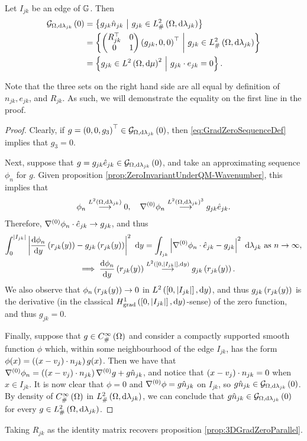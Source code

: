 \begin{prop} \label{prop:3DGradZeroRotated}
	Let $I_{jk}$ be an edge of $\mathbb{G}$.
	Then
	\begin{align*}
		\mathcal{G}_{ \Omega, \mathrm{d}\lambda_{jk}}\left( 0 \right) 
		&= \left\{  g_{jk}\hat{n}_{jk} \ \middle\vert \  g_{jk}\in L^2_{\#}\left( \Omega,\mathrm{d} \lambda_{jk} \right)  \right\} \\
		&= \left\{  \begin{pmatrix} R_{jk}^{\top} & 0 \\ 0 & 1 \end{pmatrix} \left( g_{jk},0,0 \right)^\top \ \middle\vert \  g_{jk}\in L^2_{\#}\left( \Omega,\mathrm{d} \lambda_{jk} \right)  \right\} \\
		&= \left\{  g_{jk}\in L^{2}\left( \Omega,\mathrm{d} \mu \right)^2 \ \middle\vert \  g_{jk}\cdot e_{jk} = 0  \right\}.
	\end{align*}
\end{prop}
Note that the three sets on the right hand side are all equal by definition of $n_{jk}, e_{jk}$, and $R_{jk}$.
As such, we will demonstrate the equality on the first line in the proof. 
\begin{proof}
	Clearly, if $g=\left( 0,0,g_3 \right)^\top\in\mathcal{G}_{ \Omega, \mathrm{d}\lambda_{jk}}\left( 0 \right)$, then \eqref{eq:GradZeroSequenceDef} implies that $g_3=0$.
	
	Next, suppose that $g=g_{jk}\hat{e}_{jk}\in\mathcal{G}_{ \Omega, \mathrm{d}\lambda_{jk}}\left( 0 \right)$, and take an approximating sequence $\phi_n$ for $g$.
	Given proposition \ref{prop:ZeroInvariantUnderQM-Wavenumber}, this implies that
	\begin{align*}
		\phi_n\overset{L^{2}\left( \Omega,\mathrm{d} \lambda_{jk} \right)}{\longrightarrow}0, \quad
		\nabla^{(0)}\phi_n \overset{L^{2}\left( \Omega,\mathrm{d} \lambda_{jk} \right)^3}{\longrightarrow} g_{jk}\hat{e}_{jk}.
	\end{align*}
	Therefore, $\nabla^{(0)}\phi_n\cdot\hat{e}_{jk}\rightarrow g_{jk}$, and thus
	\begin{align*}
		\int_0^{\left\lvert I_{jk} \right\rvert} \left\lvert \dfrac{\mathrm{d}\phi_n}{\mathrm{d}y}\left( r_{jk}(y) \right) - g_{jk}\left( r_{jk}(y) \right)  \right\rvert^2 \ \mathrm{d} y
		&= \int_{I_{jk}} \left\lvert \nabla^{(0)}\phi_n\cdot\hat{e}_{jk} - g_{jk} \right\rvert^2  \ \mathrm{d}\lambda_{jk} \ \text{as} \ n \rightarrow\infty, \\
		\implies \dfrac{\mathrm{d}\phi_n}{\mathrm{d}y}\left( r_{jk}(y) \right) &\overset{L^{2}\left( \left[ 0,\left\lvert I_{jk} \right\rvert \right],\mathrm{d} y \right)}{\longrightarrow} g_{jk}\left( r_{jk}(y) \right).
	\end{align*}
	We also observe that $\phi_n\left( r_{jk}(y) \right)\rightarrow 0$ in $L^{2}\left( \left[ 0,\left\lvert I_{jk} \right\rvert \right],\mathrm{d} y \right)$, and thus $g_{jk}\left( r_{jk}(y) \right)$ is the derivative (in the classical $H^1_\mathrm{grad}\left( \left[ 0,\left\lvert I_{jk} \right\rvert \right], \mathrm{d}y \right)$-sense) of the zero function, and thus $g_{jk}=0$.
	
	Finally, suppose that $g\in C^{\infty}_{\#}\left( \Omega \right)$ and consider a compactly supported smooth function $\phi$ which, within some neighbourhood of the edge $I_{jk}$, has the form $\phi(x) = \left( \left( x-v_j \right)\cdot n_{jk} \right)g(x)$.
	Then we have that $\nabla^{(0)}\phi_n = \left( \left( x-v_j \right)\cdot n_{jk} \right)\nabla^{(0)} g + g\hat{n}_{jk}$, and notice that $\left( x-v_j \right)\cdot n_{jk}	=0$ when $x\in I_{jk}$.
	It is now clear that $\phi=0$ and $\nabla^{(0)}\phi = g\hat{n}_{jk}$ on $I_{jk}$, so $g\hat{n}_{jk}\in\mathcal{G}_{ \Omega, \mathrm{d}\lambda_{jk}}\left( 0 \right)$.
	By density of $C^{\infty}_{\#}\left( \Omega \right)$ in $L^2_{\#}\left( \Omega,\mathrm{d} \lambda_{jk} \right)$, we can conclude that $g\hat{n}_{jk}\in\mathcal{G}_{ \Omega, \mathrm{d}\lambda_{jk}}\left( 0 \right)$ for every $g\in L^2_{\#}\left( \Omega,\mathrm{d} \lambda_{jk} \right)$.
\end{proof}
Taking $R_{jk}$ as the identity matrix recovers proposition \ref{prop:3DGradZeroParallel}.

